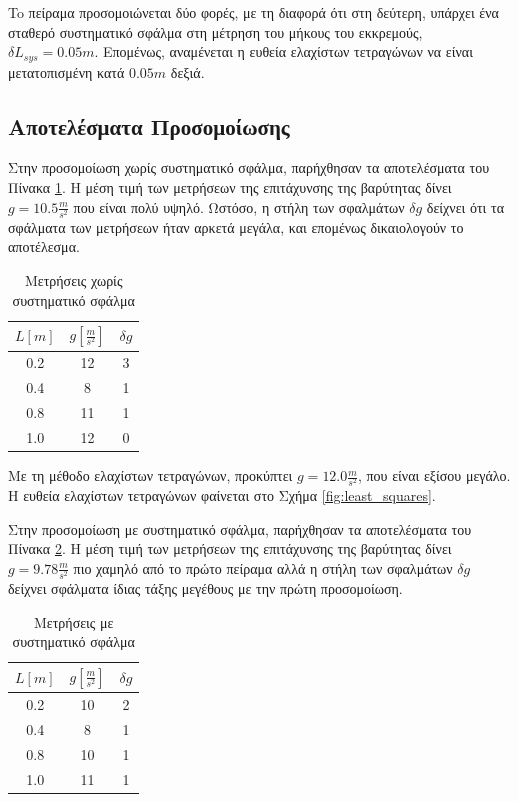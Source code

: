 \documentclass[assignment1.tex]{subfiles}
\begin{document}
To πείραμα προσομοιώνεται δύο φορές, με τη διαφορά ότι στη δεύτερη, υπάρχει ένα σταθερό συστηματικό σφάλμα στη μέτρηση του μήκους του εκκρεμούς, $\delta L_{sys}=0.05m$. Επομένως, αναμένεται η ευθεία ελαχίστων τετραγώνων να είναι μετατοπισμένη κατά $0.05m$ δεξιά.


\subsection{Αποτελέσματα Προσομοίωσης}
Στην προσομοίωση χωρίς συστηματικό σφάλμα, παρήχθησαν τα αποτελέσματα του Πίνακα \ref{table:meas1}. Η μέση τιμή των μετρήσεων της επιτάχυνσης της βαρύτητας δίνει $g=10.5\frac{m}{s^2}$ που είναι πολύ υψηλό. Ωστόσο, η στήλη των σφαλμάτων $\delta g$ δείχνει ότι τα σφάλματα των μετρήσεων ήταν αρκετά μεγάλα, και επομένως δικαιολογούν το αποτέλεσμα.

\begin{table}[ht]
\centering
\begin{tabular}{||c c c ||} 
 \hline
 $L[m]$ & $g[\frac{m}{s^2}]$ & $\delta g$ \\ [0.5ex] 
 \hline\hline
 0.2 & 12 & 3 \\ 
 0.4 & 8 & 1 \\
 0.8 & 11 & 1 \\
 1.0 & 12 & 0 \\ [1ex] 
 \hline
\end{tabular}
\caption{Μετρήσεις χωρίς συστηματικό σφάλμα}
\label{table:meas1}
\end{table}

Με τη μέθοδο ελαχίστων τετραγώνων, προκύπτει $g=12.0\frac{m}{s^2}$, που είναι εξίσου μεγάλο. Η ευθεία ελαχίστων τετραγώνων φαίνεται στο Σχήμα \ref{fig:least_squares}.

Στην προσομοίωση με συστηματικό σφάλμα, παρήχθησαν τα αποτελέσματα του Πίνακα \ref{table:meas2}. Η μέση τιμή των μετρήσεων της επιτάχυνσης της βαρύτητας δίνει $g=9.78\frac{m}{s^2}$ πιο χαμηλό από το πρώτο πείραμα αλλά η στήλη των σφαλμάτων $\delta g$ δείχνει σφάλματα ίδιας τάξης μεγέθους με την πρώτη προσομοίωση.

\begin{table}[ht]
\centering
\begin{tabular}{||c c c ||} 
 \hline
 $L[m]$ & $g[\frac{m}{s^2}]$ & $\delta g$ \\ [0.5ex] 
 \hline\hline
 0.2 & 10 & 2 \\ 
 0.4 & 8 & 1 \\
 0.8 & 10 & 1 \\
 1.0 & 11 & 1 \\ [1ex] 
 \hline
\end{tabular}
\caption{Μετρήσεις με συστηματικό σφάλμα}
\label{table:meas2}
\end{table}
\end{document}
